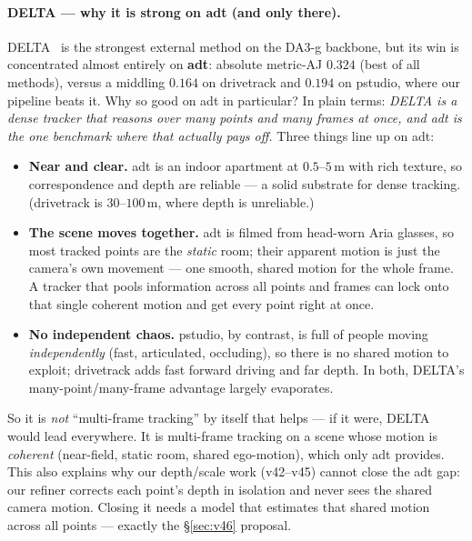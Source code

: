 \documentclass[11pt,a4paper]{article}
\begin{document}
\paragraph{DELTA --- why it is strong on adt (and only there).}
DELTA~\cite{delta} is the strongest external method on the DA3-g backbone, but its win is concentrated
almost entirely on \textbf{adt}: absolute metric-AJ $0.324$ (best of all methods), versus a middling $0.164$
on drivetrack and $0.194$ on pstudio, where our pipeline beats it. Why so good on adt in particular? In plain
terms: \emph{DELTA is a dense tracker that reasons over many points and many frames at once, and adt is the
one benchmark where that actually pays off.} Three things line up on adt:
\begin{itemize}
  \item \textbf{Near and clear.} adt is an indoor apartment at $0.5$--$5$\,m with rich texture, so
  correspondence and depth are reliable --- a solid substrate for dense tracking. (drivetrack is
  $30$--$100$\,m, where depth is unreliable.)
  \item \textbf{The scene moves together.} adt is filmed from head-worn Aria glasses, so most tracked points
  are the \emph{static} room; their apparent motion is just the camera's own movement --- one smooth, shared
  motion for the whole frame. A tracker that pools information across all points and frames can lock onto
  that single coherent motion and get every point right at once.
  \item \textbf{No independent chaos.} pstudio, by contrast, is full of people moving \emph{independently}
  (fast, articulated, occluding), so there is no shared motion to exploit; drivetrack adds fast forward
  driving and far depth. In both, DELTA's many-point/many-frame advantage largely evaporates.
\end{itemize}
So it is \emph{not} ``multi-frame tracking'' by itself that helps --- if it were, DELTA would lead
everywhere. It is multi-frame tracking on a scene whose motion is \emph{coherent} (near-field, static room,
shared ego-motion), which only adt provides. This also explains why our depth/scale work (v42--v45) cannot
close the adt gap: our refiner corrects each point's depth in isolation and never sees the shared camera
motion. Closing it needs a model that estimates that shared motion across all points --- exactly the
\S\ref{sec:v46} proposal.
\end{document}
